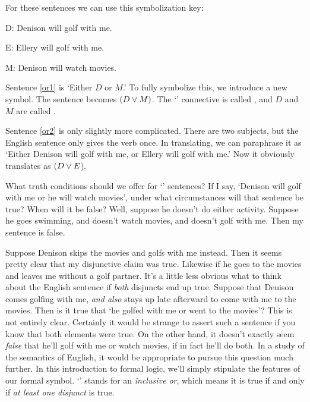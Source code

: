 For these sentences we can use this symbolization key:

\begin{ekey}
\item[D:] Denison will golf with me.
\item[E:] Ellery will golf with me.
\item[M:] Denison will watch movies.
\end{ekey}

Sentence \ref{or1} is `Either $D$ or $M$.' To fully symbolize this, we introduce a new symbol. The sentence becomes $(D \vee M)$. The `\eor' connective is called , and $D$ and $M$ are called .

Sentence \ref{or2} is only slightly more complicated. There are two subjects, but the English sentence only gives the verb once. In translating, we can paraphrase it as `Either Denison will golf with me, or Ellery will golf with me.' Now it obviously translates as $(D \vee E$).


What truth conditions should we offer for `\eor' sentences? If I say, `Denison will golf with me or he will watch movies', under what circumstances will that sentence be true? When will it be false? Well, suppose he doesn't do either activity. Suppose he goes swimming, and doesn't watch movies, and doesn't golf with me. Then my sentence is false.

Suppose Denison skips the movies and golfs with me instead. Then it seems pretty clear that my disjunctive claim was true. Likewise if he goes to the movies and leaves me without a golf partner. It's a little less obvious what to think about the English sentence if \emph{both} disjuncts end up true. Suppose that Denison comes golfing with me, \emph{and also} stays up late afterward to come with me to the movies. Then is it true that `he golfed with me or went to the movies'? This is not entirely clear. Certainly it would be strange to assert such a sentence if you know that both elements were true. On the other hand, it doesn't exactly seem \emph{false} that he'll golf with me or watch movies, if in fact he'll do both. In a study of the semantics of English, it would be appropriate to pursue this question much further. In this introduction to formal logic, we'll simply stipulate the features of our formal symbol. `\eor' stands for an \emph{inclusive or}, which means it is true if and only if \emph{at least one disjunct} is true.

